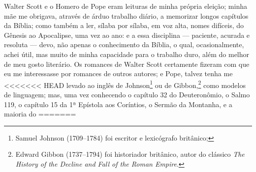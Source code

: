 Walter Scott e o Homero de Pope eram leituras de minha própria eleição;
minha mãe me obrigava, através de árduo trabalho diário, a memorizar
longos capítulos da Bíblia; como também a ler, sílaba por sílaba, em voz
alta, nomes difíceis, do Gênesis ao Apocalipse, uma vez ao ano: e a essa
disciplina --- paciente, acurada e resoluta --- devo, não apenas o
conhecimento da Bíblia, o qual, ocasionalmente, achei útil, mas muito de
minha capacidade para o trabalho duro, além do melhor de meu gosto
literário. Os romances de Walter Scott certamente fizeram com que eu me
interessasse por romances de outros autores; e Pope, talvez tenha me
<<<<<<< HEAD
levado ao inglês de Johnson\footnote{Samuel Johnson (1709--1784) foi escritor e lexicógrafo britânico;} ou de Gibbon,\footnote{Edward Gibbon (1737--1794) foi historiador britânico, autor do clássico \textit{The History of the Decline and Fall of the Roman Empire}.} como modelos de linguagem; mas, uma vez conhecendo o capítulo 32 do Deuteronômio, o Salmo 119, o capítulo 15 da 1ª Epístola aos Coríntios, o Sermão da Montanha, e a maioria do
=======
